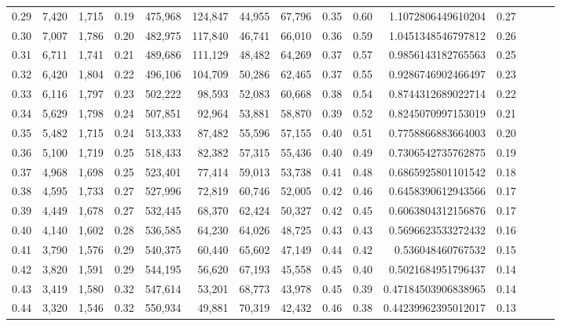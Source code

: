\begin{tabular}{rrrrrrrrrrrrrrr}
0.29 &   7,420 &  1,715 &  0.19 &  475,968 &  124,847 &   44,955 &   67,796 &  0.35 &  0.60 &     1.1072806449610204 &      0.27 \\
0.30 &   7,007 &  1,786 &  0.20 &  482,975 &  117,840 &   46,741 &   66,010 &  0.36 &  0.59 &     1.0451348546797812 &      0.26 \\
0.31 &   6,711 &  1,741 &  0.21 &  489,686 &  111,129 &   48,482 &   64,269 &  0.37 &  0.57 &     0.9856143182765563 &      0.25 \\
0.32 &   6,420 &  1,804 &  0.22 &  496,106 &  104,709 &   50,286 &   62,465 &  0.37 &  0.55 &     0.9286746902466497 &      0.23 \\
0.33 &   6,116 &  1,797 &  0.23 &  502,222 &   98,593 &   52,083 &   60,668 &  0.38 &  0.54 &     0.8744312689022714 &      0.22 \\
0.34 &   5,629 &  1,798 &  0.24 &  507,851 &   92,964 &   53,881 &   58,870 &  0.39 &  0.52 &     0.8245070997153019 &      0.21 \\
0.35 &   5,482 &  1,715 &  0.24 &  513,333 &   87,482 &   55,596 &   57,155 &  0.40 &  0.51 &     0.7758866883664003 &      0.20 \\
0.36 &   5,100 &  1,719 &  0.25 &  518,433 &   82,382 &   57,315 &   55,436 &  0.40 &  0.49 &     0.7306542735762875 &      0.19 \\
0.37 &   4,968 &  1,698 &  0.25 &  523,401 &   77,414 &   59,013 &   53,738 &  0.41 &  0.48 &     0.6865925801101542 &      0.18 \\
0.38 &   4,595 &  1,733 &  0.27 &  527,996 &   72,819 &   60,746 &   52,005 &  0.42 &  0.46 &     0.6458390612943566 &      0.17 \\
0.39 &   4,449 &  1,678 &  0.27 &  532,445 &   68,370 &   62,424 &   50,327 &  0.42 &  0.45 &     0.6063804312156876 &      0.17 \\
0.40 &   4,140 &  1,602 &  0.28 &  536,585 &   64,230 &   64,026 &   48,725 &  0.43 &  0.43 &     0.5696623533272432 &      0.16 \\
0.41 &   3,790 &  1,576 &  0.29 &  540,375 &   60,440 &   65,602 &   47,149 &  0.44 &  0.42 &      0.536048460767532 &      0.15 \\
0.42 &   3,820 &  1,591 &  0.29 &  544,195 &   56,620 &   67,193 &   45,558 &  0.45 &  0.40 &     0.5021684951796437 &      0.14 \\
0.43 &   3,419 &  1,580 &  0.32 &  547,614 &   53,201 &   68,773 &   43,978 &  0.45 &  0.39 &    0.47184503906838965 &      0.14 \\
0.44 &   3,320 &  1,546 &  0.32 &  550,934 &   49,881 &   70,319 &   42,432 &  0.46 &  0.38 &    0.44239962395012017 &      0.13 \\

\end{tabular}
